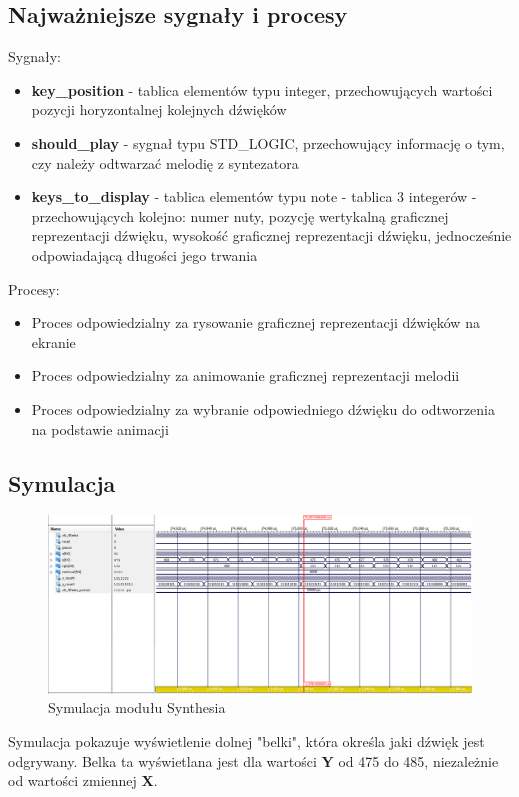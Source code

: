 \documentclass[a4paper]{report}
\begin{document}
		\subsection{Najważniejsze sygnały i procesy}
		{\Large Sygnały:}
			\begin{itemize}
				\item \textbf{key\_position} - tablica elementów typu integer, przechowujących wartości pozycji horyzontalnej kolejnych dźwięków
				\item \textbf{should\_play} - sygnał typu STD\_LOGIC, przechowujący informację o tym, czy należy odtwarzać melodię z syntezatora
				\item \textbf{keys\_to\_display} - tablica elementów typu note - tablica 3 integerów - przechowujących kolejno: numer nuty, pozycję wertykalną graficznej reprezentacji dźwięku, wysokość graficznej reprezentacji dźwięku, jednocześnie odpowiadającą długości jego trwania
			\end{itemize}
			\newpage
		{\Large Procesy:}
			\begin{itemize}
			\item Proces odpowiedzialny za rysowanie graficznej reprezentacji dźwięków na ekranie\\
						
						\newpage
			\item Proces odpowiedzialny za animowanie graficznej reprezentacji melodii\\
						
			\item Proces odpowiedzialny za wybranie odpowiedniego dźwięku do odtworzenia na podstawie animacji\\
						
			
			\end{itemize}
	\begin{landscape}
		\subsection{Symulacja}
		\begin{figure}[h!]
					\centering
					\includegraphics[width=1.6\textwidth]{synthesia_symulacja2.png}
					\caption{Symulacja modułu Synthesia}
				\end{figure}
\justify Symulacja pokazuje wyświetlenie dolnej "belki", która określa jaki dźwięk jest odgrywany. Belka ta wyświetlana jest dla wartości \textbf{Y} od 475 do 485, niezależnie od wartości zmiennej \textbf{X}.
		\end{landscape}
	
\end{document}
